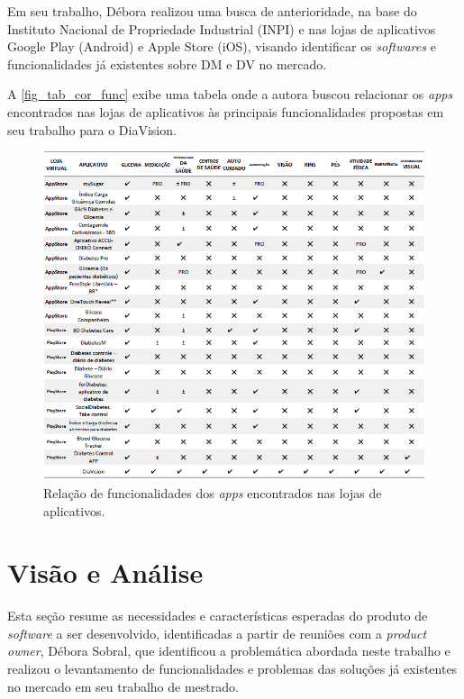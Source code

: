 Em seu trabalho, Débora realizou uma busca de anterioridade, na base do Instituto Nacional de Propriedade Industrial (INPI)
e nas lojas de aplicativos Google Play (Android) e Apple Store (iOS), visando identificar os \emph{softwares} e funcionalidades
já existentes sobre DM e DV no mercado.

A \autoref{fig_tab_cor_func} exibe uma tabela onde a autora buscou relacionar os \emph{apps} encontrados
nas lojas de aplicativos às principais funcionalidades propostas em seu trabalho para o DiaVision.

\begin{figure}[htb]
    \caption{\label{fig_tab_cor_func}Relação de funcionalidades dos \emph{apps} encontrados nas lojas de aplicativos.}
    \begin{center}
        \includegraphics[scale=0.8]{Imagens/proposta/busca_anterioridade.png}
    \end{center}
\end{figure}

\newpage

\section{Visão e Análise}

Esta seção resume as necessidades e características esperadas do produto de \emph{software} a ser desenvolvido, identificadas a partir de
reuniões com a \emph{product owner}, Débora Sobral, que identificou a problemática abordada neste trabalho e realizou o levantamento de
funcionalidades e problemas das soluções já existentes no mercado em seu trabalho de mestrado.

